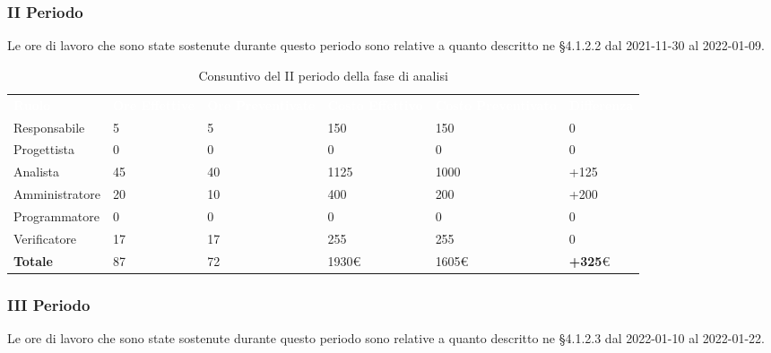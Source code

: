 \subsubsection{II Periodo}
Le ore di lavoro che sono state sostenute durante questo periodo sono relative a quanto descritto ne §4.1.2.2 dal 2021-11-30 al 2022-01-09.

\begin{table}[H]
\begin{center}
\renewcommand{\arraystretch}{1.5}
\begin{tabular}{ m{}<{\centering}  m{}<{\centering} m{}<{\centering} m{}<{\centering} m{}<{\centering} m{}<{\centering}}
	\rowcolor{darkblue}
	\textcolor{white}{\textbf{Ruolo}} & \textcolor{white}{\textbf{Ore Effettive}} & \textcolor{white}{\textbf{Ore Preventivate}}&\textcolor{white}{\textbf{Costo Effettivo}}&\textcolor{white}{\textbf{Costo Preventivato}}&\textcolor{white}{\textbf{Differenza}}\\ 

	Responsabile  & 5 & 5 & 150 & 150 & 0\\	
	
	Progettista & 0 & 0 & 0 & 0 & 0\\
	
	Analista & 45 & 40 & 1125 & 1000 & +125\\
	
	Amministratore & 20 & 10 & 400 & 200 & +200\\
	
	Programmatore & 0 & 0 &0 &0 & 0\\
	
	Verificatore & 17 & 17 & 255 & 255 & 0\\
	
	\textbf{Totale} & 87 & 72 & 1930\euro & 1605\euro & \textbf{+325}\euro \\
	
\end{tabular}
\caption{Consuntivo del II periodo della fase di analisi}
\end{center}
\end{table}


\subsubsection{III Periodo}
Le ore di lavoro che sono state sostenute durante questo periodo sono relative a quanto descritto ne §4.1.2.3 dal 2022-01-10 al 2022-01-22.

